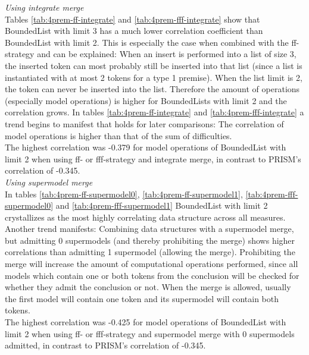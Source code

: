 \documentclass[hidelinks]{scrartcl}
\begin{document}
\textit{Using integrate merge} \\
Tables \ref{tab:4prem-ff-integrate} and \ref{tab:4prem-fff-integrate} show that BoundedList with limit 3 has a much lower correlation coefficient than BoundedList with limit 2. This is especially the case when combined with the ff-strategy and can be explained: When an insert is performed into a list of size 3, the inserted token can most probably still be inserted into that list (since a list is instantiated with at most 2 tokens for a type 1 premise). When the list limit is 2, the token can never be inserted into the list. Therefore the amount of operations (especially model operations) is higher for BoundedLists with limit 2 and the correlation grows. 
In tables \ref{tab:4prem-ff-integrate} and \ref{tab:4prem-fff-integrate} a trend begins to manifest that holds for later comparisons: The correlation of model operations is higher than that of the sum of difficulties. \\
The highest correlation was -0.379 for model operations of BoundedList with limit 2 when using ff- or fff-strategy and integrate merge, in contrast to PRISM's correlation of -0.345. \\

\textit{Using supermodel merge} \\
In tables \ref{tab:4prem-ff-supermodel0}, \ref{tab:4prem-ff-supermodel1}, \ref{tab:4prem-fff-supermodel0} and \ref{tab:4prem-fff-supermodel1} BoundedList with limit 2 crystallizes as the most highly correlating data structure across all measures. \\
Another trend manifests: Combining data structures with a supermodel merge, but admitting 0 supermodels (and thereby prohibiting the merge) shows higher correlations than admitting 1 supermodel (allowing the merge). Prohibiting the merge will increase the amount of computational operations performed, since all models which contain one or both tokens from the conclusion will be checked for whether they admit the conclusion or not. When the merge is allowed, usually the first model will contain one token and its supermodel will contain both tokens. \\
The highest correlation was -0.425 for model operations of BoundedList with limit 2 when using ff- or fff-strategy and supermodel merge with 0 supermodels admitted, in contrast to PRISM's correlation of -0.345. \\
\end{document}
